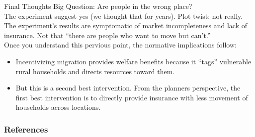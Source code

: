 \documentclass[9pt,pdftex,aspectratio=1610]{beamer}
\theoremstyle{definition}
\begin{document}
\begin{frame}[t]{Final Thoughts}
Big Question: Are people in the wrong place? \\
\medskip
The experiment suggest yes (we thought that for years). Plot twist: not really.\\
\bigskip
\smallskip
The experiment's results are symptomatic of market incompleteness and lack of insurance. Not that ``there are people who want to move but can't.''\\
\bigskip
Once you understand this pervious point, the normative implications follow:
\begin{itemize}
\smallskip
\item Incentivizing migration provides welfare benefits because it ``tags'' vulnerable rural households and directs resources toward them.
\smallskip
\item But this is a second best intervention. From the planners perspective, the first best intervention is to directly provide insurance with less movement of households across locations.
\end{itemize}
\end{frame}


\appendix

\setcounter{finalframe}{\value{framenumber}}


%

\begin{frame}[allowframebreaks]
\frametitle{References}
\scriptsize

\end{frame}
\end{document}
